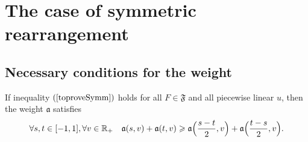 \section{The case of symmetric rearrangement}

\subsection{Necessary conditions for the weight}

\begin{lm}
If inequality $(\ref{toproveSymm})$ holds for all $F \in \mathfrak{F}$
and all piecewise linear $u$, then
the weight $\mathfrak a$ satisfies
\begin{equation}
\label{almostConvex}
\forall s, t \in [-1, 1], \forall v \in \Real_+ \quad
\mathfrak a( s, v ) + \mathfrak a( t, v ) \ge \mathfrak a\Big( \frac{ s - t }{2}, v \Big) + \mathfrak a\Big( \frac{ t - s }{2}, v \Big).
\end{equation}
\end{lm}

